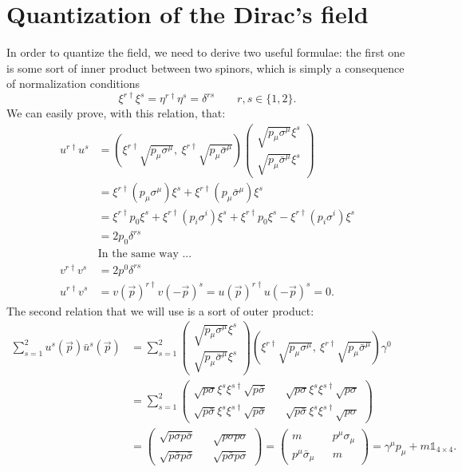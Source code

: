 \section{Quantization of the Dirac's field}
In order to quantize the field, we need to derive two useful formulae: the first one is some sort of inner product between two spinors, which is simply a consequence of normalization conditions
\begin{equation*}
    \xi^{r\dagger}\xi^s=\eta^{r\dagger}\eta^{s}=\delta^{rs}\qquad r,s\in\{1,2\}.
\end{equation*} 
We can easily prove, with this relation, that:
\begin{align*}
    u^{r\dagger}u^s&=(\xi^{r\dagger}\sqrt{p_\mu\sigma^\mu},\ \xi^{r\dagger}\sqrt{p_\mu\bar\sigma^\mu})\begin{pmatrix}
        \sqrt{p_\mu\sigma^\mu}\xi^{s}\\\sqrt{p_\mu\bar\sigma^\mu}\xi^{s}
    \end{pmatrix}\\&=\xi^{r\dagger}(p_\mu\sigma^\mu)\xi^s+\xi^{r\dagger}(p_\mu\bar\sigma^\mu)\xi^s\\&=\xi^{r\dagger}p_0\xi^s+\xi^{r\dagger}(p_i\sigma^i)\xi^s+\xi^{r\dagger}p_0\xi^s-\xi^{r\dagger}(p_i\sigma^i)\xi^s\\&=2p_0\delta^{rs}\\&\text{In the same way ...}\\v^{r\dagger}v^s&=2p^0\delta^{rs}\\u^{r\dagger}v^s&=v(\vec p)^{r\dagger}v(-\vec p)^s=u(\vec p)^{r\dagger}u(-\vec p)^s=0.
\end{align*}
The second relation that we will use is a sort of outer product:
\begin{align*}
    \sum_{s=1}^{2}u^{s}(\vec p)\bar{u}^s(\vec p)&= \sum_{s=1}^{2}\begin{pmatrix}
        \sqrt{p_\mu\sigma^\mu}\xi^{s}\\\sqrt{p_\mu\bar\sigma^\mu}\xi^{s} 
    \end{pmatrix}(\xi^{r\dagger}\sqrt{p_\mu\sigma^\mu},\ \xi^{r\dagger}\sqrt{p_\mu\bar\sigma^\mu})\gamma^0\\&=\sum_{s=1}^{2}\begin{pmatrix}
        \sqrt{p\sigma}\xi^s\xi^{s\dagger}\sqrt{p\bar\sigma}&&\sqrt{p\sigma}\xi^s\xi^{s\dagger}\sqrt{p\sigma}\\\sqrt{p\bar\sigma}\xi^s\xi^{s\dagger}\sqrt{p\bar\sigma}&&\sqrt{p\bar\sigma}\xi^s\xi^{s\dagger}\sqrt{p\sigma}\end{pmatrix}\\&=\begin{pmatrix}
          \sqrt{p\sigma p\bar\sigma}  && \sqrt{p\sigma p\sigma}\\\sqrt{p\bar\sigma p\bar\sigma}  && \sqrt{p\bar\sigma p\sigma}
        \end{pmatrix}=\begin{pmatrix}
            m&&p^\mu\sigma_\mu\\p^\mu\bar\sigma_\mu&&m
        \end{pmatrix}
    =\gamma^\mu p_\mu+m\mathds{1}_{4\times4}.
\end{align*}
